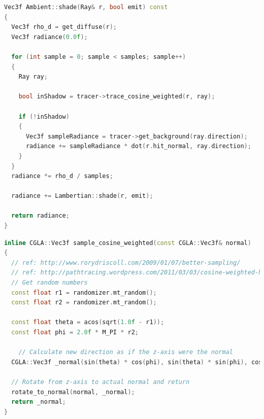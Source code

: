  \newpage
 \begin{lstlisting}[language=C++,caption=Ambient::shade,label=lst:ambient::shade]
 Vec3f Ambient::shade(Ray& r, bool emit) const
{ 
  Vec3f rho_d = get_diffuse(r);
  Vec3f radiance(0.0f);

  for (int sample = 0; sample < samples; sample++)
  {
    Ray ray;

    bool inShadow = tracer->trace_cosine_weighted(r, ray);

    if (!inShadow)
    {
      Vec3f sampleRadiance = tracer->get_background(ray.direction);
      radiance += sampleRadiance * dot(r.hit_normal, ray.direction);
    }
  }
  radiance *= rho_d / samples;

  radiance += Lambertian::shade(r, emit);

  return radiance;
}
 \end{lstlisting}
 
 \begin{lstlisting}[language=C++,caption=sampler.h sample\_cosine\_weighted,label=lst:samplecosineweighted]
 inline CGLA::Vec3f sample_cosine_weighted(const CGLA::Vec3f& normal)
{
  // ref: http://www.rorydriscoll.com/2009/01/07/better-sampling/
  // ref: http://pathtracing.wordpress.com/2011/03/03/cosine-weighted-hemisphere/
  // Get random numbers
  const float r1 = randomizer.mt_random();
  const float r2 = randomizer.mt_random();

  const float theta = acos(sqrt(1.0f - r1));
  const float phi = 2.0f * M_PI * r2;

	// Calculate new direction as if the z-axis were the normal
  CGLA::Vec3f _normal(sin(theta) * cos(phi), sin(theta) * sin(phi), cos(theta));

  // Rotate from z-axis to actual normal and return
  rotate_to_normal(normal, _normal);
  return _normal;
}
\end{lstlisting}